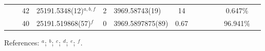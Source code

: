 \begin{table*}
\begin{center}
{\begin{tabular}{:l;l;c;l;c;l;c;l;l;c;c;c;c}
\rowstyle{\itshape}               &        & 42        & 25191.5348(12)$^{a,b,f}$         & 2 &    3969.58743(19)  &   14 & $                                        $ & $                                        $ & $      $ &              & 0.647\%   & $          $\\
\rowstyle{\itshape}               &        & 40        & 25191.519868(57)$^{f}$           & 0 &  3969.5897875(89)  & 0.67 & $                                        $ & $                                        $ & $      $ &              & 96.941\%  & $          $\\
\hline
\end{tabular}
}
{\footnotesize References:
$^{a}$\citet{Maleki:1992:524};
$^{b}$\citet{Martensson-Pendrill:1992:467};
$^{c}$\citet{Wolf:2009:223901};
$^{d}$\citet{Arbes:1994:27};
$^{e}$\citet{Nortershauser:1998:33};
$^{f}$\citet{Wolf:2008:032511}.}
\end{center}
\end{table*}
